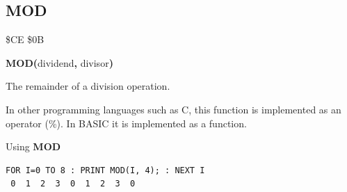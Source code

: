 
\newpage
\subsection{MOD}
\begin{description}[leftmargin=2cm,style=nextline]
\item [Token:]    \$CE \$0B

\item [Format:]   {\bf MOD(}dividend{\bf,} divisor{\bf)}

\item [Returns:]  The remainder of a division operation.

\item [Remarks:]  In other programming languages such as C, this function is implemented as an operator (\%). In BASIC it is implemented as a function.

\item [Example:]  Using {\bf MOD}

\begin{tcolorbox}[colback=black,coltext=white]
\verbatimfont{\codefont}
\begin{verbatim}
FOR I=0 TO 8 : PRINT MOD(I, 4); : NEXT I
 0  1  2  3  0  1  2  3  0
\end{verbatim}
\end{tcolorbox}
\end{description}


\newpage
